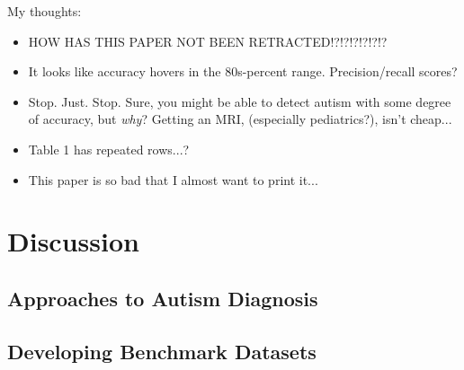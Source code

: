 \documentclass[letterpaper]{article}
\begin{document}
My thoughts:
\begin{itemize}
    \item HOW HAS THIS PAPER NOT BEEN RETRACTED!?!?!?!?!?!?
    \item It looks like accuracy hovers in the 80s-percent range. Precision/recall scores?
    \item Stop. Just. Stop. Sure, you might be able to detect autism with some degree of accuracy, but \textit{why}? Getting an MRI, (especially pediatrics?), isn't cheap...
    \item Table 1 has repeated rows...?
    \item This paper is so bad that I almost want to print it...
\end{itemize}

\section{Discussion}
\subsection{Approaches to Autism Diagnosis}
\subsection{Developing Benchmark Datasets}


\newpage
\printbibliography[heading=bibintoc, title={Bibliography}]
\end{document}
